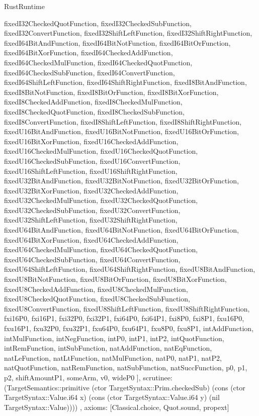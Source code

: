 \begin{lexlean}{RustRuntime}
\begin{semanticmodule}
{{      fixedI32CheckedQuotFunction,
      fixedI32CheckedSubFunction,
      fixedI32ConvertFunction,
      fixedI32ShiftLeftFunction,
      fixedI32ShiftRightFunction,
      fixedI64BitAndFunction,
      fixedI64BitNotFunction,
      fixedI64BitOrFunction,
      fixedI64BitXorFunction,
      fixedI64CheckedAddFunction,
      fixedI64CheckedMulFunction,
      fixedI64CheckedQuotFunction,
      fixedI64CheckedSubFunction,
      fixedI64ConvertFunction,
      fixedI64ShiftLeftFunction,
      fixedI64ShiftRightFunction,
      fixedI8BitAndFunction,
      fixedI8BitNotFunction,
      fixedI8BitOrFunction,
      fixedI8BitXorFunction,
      fixedI8CheckedAddFunction,
      fixedI8CheckedMulFunction,
      fixedI8CheckedQuotFunction,
      fixedI8CheckedSubFunction,
      fixedI8ConvertFunction,
      fixedI8ShiftLeftFunction,
      fixedI8ShiftRightFunction,
      fixedU16BitAndFunction,
      fixedU16BitNotFunction,
      fixedU16BitOrFunction,
      fixedU16BitXorFunction,
      fixedU16CheckedAddFunction,
      fixedU16CheckedMulFunction,
      fixedU16CheckedQuotFunction,
      fixedU16CheckedSubFunction,
      fixedU16ConvertFunction,
      fixedU16ShiftLeftFunction,
      fixedU16ShiftRightFunction,
      fixedU32BitAndFunction,
      fixedU32BitNotFunction,
      fixedU32BitOrFunction,
      fixedU32BitXorFunction,
      fixedU32CheckedAddFunction,
      fixedU32CheckedMulFunction,
      fixedU32CheckedQuotFunction,
      fixedU32CheckedSubFunction,
      fixedU32ConvertFunction,
      fixedU32ShiftLeftFunction,
      fixedU32ShiftRightFunction,
      fixedU64BitAndFunction,
      fixedU64BitNotFunction,
      fixedU64BitOrFunction,
      fixedU64BitXorFunction,
      fixedU64CheckedAddFunction,
      fixedU64CheckedMulFunction,
      fixedU64CheckedQuotFunction,
      fixedU64CheckedSubFunction,
      fixedU64ConvertFunction,
      fixedU64ShiftLeftFunction,
      fixedU64ShiftRightFunction,
      fixedU8BitAndFunction,
      fixedU8BitNotFunction,
      fixedU8BitOrFunction,
      fixedU8BitXorFunction,
      fixedU8CheckedAddFunction,
      fixedU8CheckedMulFunction,
      fixedU8CheckedQuotFunction,
      fixedU8CheckedSubFunction,
      fixedU8ConvertFunction,
      fixedU8ShiftLeftFunction,
      fixedU8ShiftRightFunction,
      fxi16P0,
      fxi16P1,
      fxi32P0,
      fxi32P1,
      fxi64P0,
      fxi64P1,
      fxi8P0,
      fxi8P1,
      fxu16P0,
      fxu16P1,
      fxu32P0,
      fxu32P1,
      fxu64P0,
      fxu64P1,
      fxu8P0,
      fxu8P1,
      intAddFunction,
      intMulFunction,
      intNegFunction,
      intP0,
      intP1,
      intP2,
      intQuotFunction,
      intRemFunction,
      intSubFunction,
      natAddFunction,
      natEqFunction,
      natLeFunction,
      natLtFunction,
      natMulFunction,
      natP0,
      natP1,
      natP2,
      natQuotFunction,
      natRemFunction,
      natSubFunction,
      natSuccFunction,
      p0,
      p1,
      p2,
      shiftAmountP1,
      someArm,
      v0,
      wideP0
    ],
    scrutinee: (TargetSemantics::primitive (ctor TargetSyntax::Prim.checkedSub) (cons (ctor TargetSyntax::Value.i64 x) (cons (ctor TargetSyntax::Value.i64 y) (nil TargetSyntax::Value))))
  },
  axioms: [Classical.choice, Quot.sound, propext]
}


\end{semanticmodule}
\end{lexlean}
